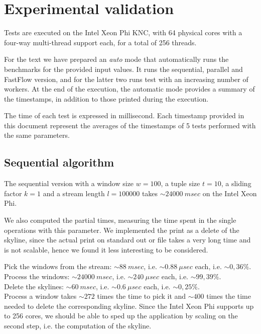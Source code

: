 \section{Experimental validation}
Tests are executed on the Intel Xeon Phi KNC, with 64 physical cores with a four-way multi-thread support each, for a total of 256 threads.

For the text we have prepared an \textit{auto} mode that automatically runs the benchmarks for the provided input values. It runs the sequential, parallel and FastFlow version, and for the latter two runs test with an increasing number of workers. At the end of the execution, the automatic mode provides a summary of the timestamps, in addition to those printed during the execution.

The time of each test is expressed in millisecond. Each timestamp provided in this document represent the averages of the timestamps of 5 tests performed with the same parameters.



\subsection{Sequential algorithm}
The sequential version with a window size $w = 100$, a tuple size $t = 10$, a sliding factor $k = 1$ and a stream length $l = 100000$ takes $\sim 24000 \ msec$ on the Intel Xeon Phi.

\bigskip\noindent
We also computed the partial times, measuring the time spent in the single operations with this parameter. We implemented the print as a delete of the skyline, since the actual print on standard out or file takes a very long time and is not scalable, hence we found it less interesting to be considered.

\medskip\noindent
Pick the windows from the stream: $\sim 88 \ msec$, i.e. $\sim 0.88 \ \mu sec$ each, i.e. $\sim 0,36\%$.\\
Process the windows: $\sim 24000 \ msec$, i.e. $\sim 240 \ \mu sec$ each, i.e. $\sim 99,39\%$.\\
Delete the skylines: $\sim 60 \ msec$, i.e. $\sim 0.6 \ \mu sec$ each, i.e. $\sim 0,25\%$.\\

\bigskip\noindent
Process a window takes $\sim 272$ times the time to pick it and $\sim 400$ times the time needed to delete the corresponding skyline. Since the Intel Xeon Phi supports up to 256 cores, we should be able to sped up the application by scaling on the second step, i.e. the computation of the skyline.



